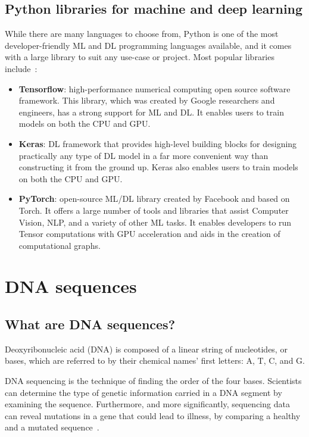\subsection{Python libraries for machine and deep learning}

While there are many languages to choose from, Python is one of the most developer-friendly \gls{ML} and \gls{DL} programming languages available, and it comes with a large library to suit any use-case or project. Most popular libraries include~\cite{JonssonWaysDevelopment,BestGeeksforGeeks}:

\begin{itemize}
    \item \textbf{Tensorflow}: high-performance numerical computing open source software framework. This library, which was created by Google researchers and engineers, has a strong support for \gls{ML} and \gls{DL}.  It enables users to train models on both the CPU and GPU.
    \item \textbf{Keras}: \gls{DL} framework that provides high-level building blocks for designing practically any type of \gls{DL} model in a far more convenient way than constructing it from the ground up. Keras also enables users to train models on both the CPU and GPU.
    \item \textbf{PyTorch}: open-source \gls{ML}/\gls{DL} library created by Facebook and based on Torch. It offers a large number of tools and libraries that assist Computer Vision, \gls{NLP}, and a variety of other \gls{ML} tasks. It enables developers to run Tensor computations with GPU acceleration and aids in the creation of computational graphs.
\end{itemize}

\section{DNA sequences} \label{sec:dna_sequences}

\subsection{What are DNA sequences?} \label{subsec:what_are_dna_sequences}

Deoxyribonucleic acid (DNA) is composed of a linear string of nucleotides, or bases, which are referred to by their chemical names' first letters: \gls{A}, \gls{T}, \gls{C}, and \gls{G}. 

DNA sequencing is the technique of finding the order of the four bases. Scientists can determine the type of genetic information carried in a DNA segment by examining the sequence. Furthermore, and more significantly, sequencing data can reveal mutations in a gene that could lead to illness, by comparing a healthy and a mutated sequence~\cite{2020DNASheet}.

